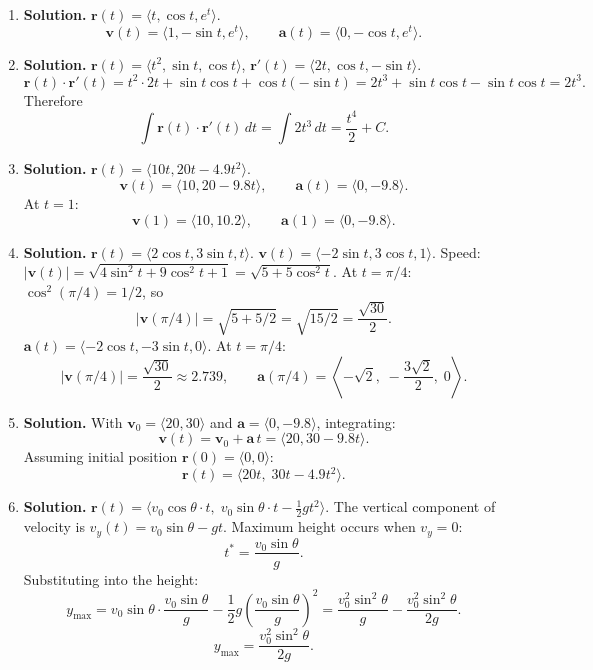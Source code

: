 \begin{enumerate}
\item \textbf{Solution.}
$\mathbf{r}(t)=\langle t, \cos t, e^t\rangle$.
\[
\boxed{\mathbf{v}(t)=\langle 1, -\sin t, e^t\rangle, \qquad \mathbf{a}(t)=\langle 0, -\cos t, e^t\rangle.}
\]

\item \textbf{Solution.}
$\mathbf{r}(t)=\langle t^2, \sin t, \cos t\rangle$, $\mathbf{r}'(t)=\langle 2t, \cos t, -\sin t\rangle$.
\[
\mathbf{r}(t)\cdot\mathbf{r}'(t) = t^2\cdot 2t + \sin t\cos t + \cos t(-\sin t) = 2t^3 + \sin t\cos t - \sin t\cos t = 2t^3.
\]
Therefore
\[
\boxed{\int \mathbf{r}(t)\cdot\mathbf{r}'(t)\,dt = \int 2t^3\,dt = \frac{t^4}{2}+C.}
\]


\item \textbf{Solution.}
$\mathbf{r}(t)=\langle 10t, 20t-4.9t^2\rangle$.
\[
\mathbf{v}(t)=\langle 10, 20-9.8t\rangle, \qquad \mathbf{a}(t)=\langle 0, -9.8\rangle.
\]
At $t=1$:
\[
\boxed{\mathbf{v}(1)=\langle 10, 10.2\rangle, \qquad \mathbf{a}(1)=\langle 0, -9.8\rangle.}
\]

\item \textbf{Solution.}
$\mathbf{r}(t)=\langle 2\cos t, 3\sin t, t\rangle$.
$\mathbf{v}(t)=\langle -2\sin t, 3\cos t, 1\rangle$.
Speed: $|\mathbf{v}(t)|=\sqrt{4\sin^2 t+9\cos^2 t+1}=\sqrt{5+5\cos^2 t}$.
At $t=\pi/4$: $\cos^2(\pi/4)=1/2$, so
\[
|\mathbf{v}(\pi/4)|=\sqrt{5+5/2}=\sqrt{15/2}=\frac{\sqrt{30}}{2}.
\]
$\mathbf{a}(t)=\langle -2\cos t, -3\sin t, 0\rangle$.
At $t=\pi/4$:
\[
\boxed{|\mathbf{v}(\pi/4)|=\frac{\sqrt{30}}{2}\approx 2.739,\qquad \mathbf{a}(\pi/4)=\left\langle -\sqrt{2},\; -\frac{3\sqrt{2}}{2},\; 0\right\rangle.}
\]

\item \textbf{Solution.}
With $\mathbf{v}_0=\langle 20,30\rangle$ and $\mathbf{a}=\langle 0,-9.8\rangle$, integrating:
\[
\mathbf{v}(t)=\mathbf{v}_0+\mathbf{a}\,t=\langle 20, 30-9.8t\rangle.
\]
Assuming initial position $\mathbf{r}(0)=\langle 0,0\rangle$:
\[
\boxed{\mathbf{r}(t)=\langle 20t,\; 30t - 4.9t^2\rangle.}
\]

\item \textbf{Solution.}
$\mathbf{r}(t)=\langle v_0\cos\theta\cdot t,\; v_0\sin\theta\cdot t-\tfrac{1}{2}gt^2\rangle$.
The vertical component of velocity is $v_y(t)=v_0\sin\theta - gt$.
Maximum height occurs when $v_y=0$:
\[
t^*=\frac{v_0\sin\theta}{g}.
\]
Substituting into the height:
\[
y_{\max}=v_0\sin\theta\cdot\frac{v_0\sin\theta}{g}-\frac{1}{2}g\left(\frac{v_0\sin\theta}{g}\right)^2 = \frac{v_0^2\sin^2\theta}{g}-\frac{v_0^2\sin^2\theta}{2g}.
\]
\[
\boxed{y_{\max}=\frac{v_0^2\sin^2\theta}{2g}.}
\]


\end{enumerate}
